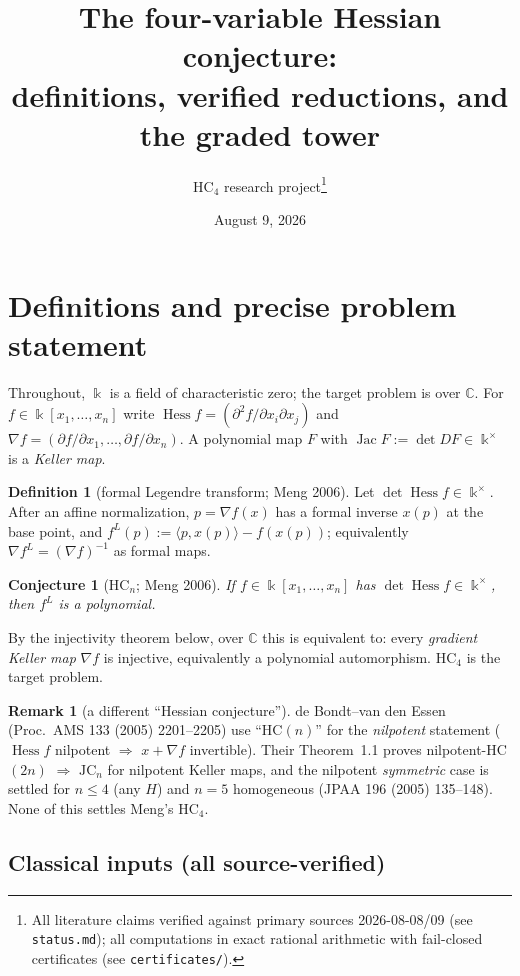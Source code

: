 \documentclass[11pt]{article}
\title{The four-variable Hessian conjecture:\\ definitions, verified reductions, and the graded tower}
\author{HC$_4$ research project\thanks{All literature claims verified against
primary sources 2026-08-08/09 (see \texttt{status.md}); all computations in
exact rational arithmetic with fail-closed certificates (see
\texttt{certificates/}).}}
\date{August 9, 2026}
\theoremstyle{plain}
\newtheorem{conjecture}[theorem]{Conjecture}
\theoremstyle{definition}
\newtheorem{definition}[theorem]{Definition}
\newtheorem{remark}[theorem]{Remark}
\newcommand{\C}{\mathbb{C}}
\newcommand{\kk}{\Bbbk}
\newcommand{\Hess}{\operatorname{Hess}}
\newcommand{\Jac}{\operatorname{Jac}}
\newcommand{\JC}{\mathrm{JC}}
\newcommand{\HC}{\mathrm{HC}}
\begin{document}
\maketitle

\section{Definitions and precise problem statement}

Throughout, $\kk$ is a field of characteristic zero; the target problem is
over $\C$. For $f\in\kk[x_1,\dots,x_n]$ write $\Hess f=(\partial^2
f/\partial x_i\partial x_j)$ and $\nabla f=(\partial f/\partial
x_1,\dots,\partial f/\partial x_n)$. A polynomial map $F$ with $\Jac
F:=\det DF\in\kk^\times$ is a \emph{Keller map}.

\begin{definition}[formal Legendre transform; Meng 2006]
Let $\det\Hess f\in\kk^\times$. After an affine normalization, $p=\nabla
f(x)$ has a formal inverse $x(p)$ at the base point, and
$f^L(p):=\langle p,x(p)\rangle-f(x(p))$; equivalently $\nabla
f^L=(\nabla f)^{-1}$ as formal maps.
\end{definition}

\begin{conjecture}[$\HC_n$; Meng 2006]
If $f\in\kk[x_1,\dots,x_n]$ has $\det\Hess f\in\kk^\times$, then $f^L$ is a
polynomial.
\end{conjecture}

By the injectivity theorem below, over $\C$ this is equivalent to: every
\emph{gradient Keller map} $\nabla f$ is injective, equivalently a polynomial
automorphism. $\HC_4$ is the target problem.

\begin{remark}[a different ``Hessian conjecture'']
de Bondt--van den Essen (Proc.\ AMS 133 (2005) 2201--2205) use ``HC$(n)$''
for the \emph{nilpotent} statement ($\Hess f$ nilpotent $\Rightarrow$
$x+\nabla f$ invertible). Their Theorem~1.1 proves nilpotent-HC$(2n)$
$\Rightarrow$ $\JC_n$ for nilpotent Keller maps, and the nilpotent
\emph{symmetric} case is settled for $n\le4$ (any $H$) and $n=5$
homogeneous (JPAA 196 (2005) 135--148). None of this settles Meng's
$\HC_4$.
\end{remark}

\subsection{Classical inputs (all source-verified)}
\end{document}
